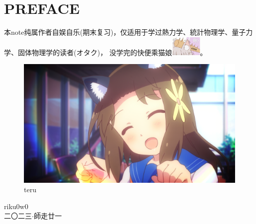 \chapter*{PREFACE}

本note纯属作者自娱自乐(期末复习)，仅适用于学过熱力学、統計物理学、量子力学、固体物理学的读者(オタク)，\vspace{1ex}
没学完的快便乘猫娘\includegraphics[width=4em,align=c]{idiot.jpg}。
\begin{figure}[ht]
    \centering
    \includegraphics[width=\linewidth]{teru.png}
    \caption*{teru}
    \label{fig:teru-star}
\end{figure}

\begin{flushright}
	riku0w0 \\
	二〇二三$\cdot$師走廿一\\
\end{flushright}

